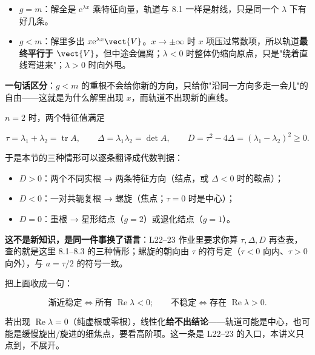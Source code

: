 \documentclass[11pt]{ctexart}
\begin{document}

\begin{itemize}
  \item $g=m$：解全是 $\mathrm{e}^{\lambda x}$ 乘特征向量，轨道与 8.1 一样是射线，只是同一个 $\lambda$ 下有好几条。
  \item $g<m$：解里多出 $x\mathrm{e}^{\lambda x}\vect{V}$。$x\to\pm\infty$ 时 $x$ 项压过常数项，所以轨道\textbf{最终平行于 $\vect{V}$}，但中途会偏离；$\lambda<0$ 时整体仍缩向原点，只是"绕着直线弯进来"；$\lambda>0$ 时向外甩。
\end{itemize}

\textbf{一句话区分}：$g<m$ 的重根不会给你新的方向，只给你"沿同一方向多走一会儿"的自由——这就是为什么解里出现 $x$，而轨道不出现新的直线。


$n=2$ 时，两个特征值满足

\[
\tau=\lambda_1+\lambda_2=\operatorname{tr}A,\qquad
\Delta=\lambda_1\lambda_2=\det A,\qquad
D=\tau^2-4\Delta=(\lambda_1-\lambda_2)^2\ge0 .
\]

于是本节的三种情形可以逐条翻译成代数判据：

\begin{itemize}
  \item $D>0$：两个不同实根 → 两条特征方向（结点，或 $\Delta<0$ 时的鞍点）；
  \item $D<0$：一对共轭复根 → 螺旋（焦点；$\tau=0$ 时是中心）；
  \item $D=0$：重根 → 星形结点（$g=2$）或退化结点（$g=1$）。
\end{itemize}

\textbf{这不是新知识，是同一件事换了语言}：L22--23 作业里要求你算 $\tau,\Delta,D$ 再查表，查的就是这里 8.1–8.3 的三种情形；螺旋的朝向由 $\tau$ 的符号定（$\tau<0$ 向内、$\tau>0$ 向外），与 $a=\tau/2$ 的符号一致。


把上面收成一句：

\[
\text{渐近稳定}\iff\text{所有 }\operatorname{Re}\lambda<0;
\qquad
\text{不稳定}\iff\text{存在 }\operatorname{Re}\lambda>0 .
\]

若出现 $\operatorname{Re}\lambda=0$（纯虚根或零根），线性化\textbf{给不出结论}——轨道可能是中心，也可能是缓慢旋出/旋进的细焦点，要看高阶项。这一条是 L22--23 的入口，本讲义只点到，不展开。

\end{document}
